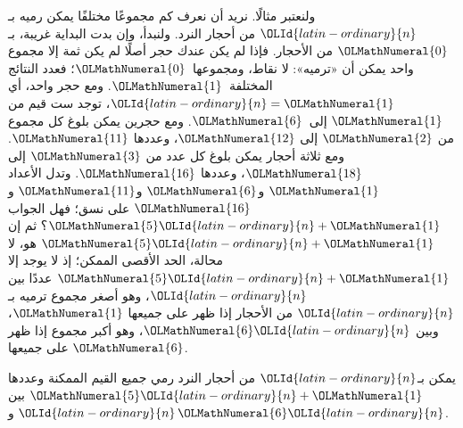 \documentclass[../../../include/open-logic-section]{subfiles}
\begin{document}
ولنعتبر مثالًا. نريد أن نعرف كم مجموعًا مختلفًا يمكن رميه بـ${\OLId{latin-ordinary}{n}}$ من
أحجار النرد. ولنبدأ، وإن بدت البداية غريبة، بـ${\OLMathNumeral{0}}$ من الأحجار. فإذا لم
يكن عندك حجر أصلًا لم يكن ثمة إلا مجموع واحد يمكن أن «ترميه»: لا نقاط،
ومجموعها~${\OLMathNumeral{0}}$؛ فعدد النتائج المختلفة~${\OLMathNumeral{1}}$. ومع حجر واحد، أي ${\OLId{latin-ordinary}{n}}={\OLMathNumeral{1}}$،
توجد ست قيم من ${\OLMathNumeral{1}}$ إلى~${\OLMathNumeral{6}}$. ومع حجرين يمكن بلوغ كل مجموع من ${\OLMathNumeral{2}}$ إلى
${\OLMathNumeral{12}}$، وعددها ${\OLMathNumeral{11}}$. ومع ثلاثة أحجار يمكن بلوغ كل عدد من ${\OLMathNumeral{3}}$ إلى
${\OLMathNumeral{18}}$، وعددها ${\OLMathNumeral{16}}$. وتدل الأعداد ${\OLMathNumeral{1}}$ و${\OLMathNumeral{6}}$ و${\OLMathNumeral{11}}$ و${\OLMathNumeral{16}}$ على نسق؛ فهل
الجواب ${\OLMathNumeral{5}}{\OLId{latin-ordinary}{n}}+{\OLMathNumeral{1}}$؟ ثم إن ${\OLMathNumeral{5}}{\OLId{latin-ordinary}{n}}+{\OLMathNumeral{1}}$ هو، لا محالة، الحد الأقصى الممكن؛ إذ لا
يوجد إلا ${\OLMathNumeral{5}}{\OLId{latin-ordinary}{n}}+{\OLMathNumeral{1}}$ عددًا بين ${\OLId{latin-ordinary}{n}}$، وهو أصغر مجموع ترميه بـ${\OLId{latin-ordinary}{n}}$ من الأحجار
إذا ظهر على جميعها ${\OLMathNumeral{1}}$، وبين ${\OLMathNumeral{6}}{\OLId{latin-ordinary}{n}}$، وهو أكبر مجموع إذا ظهر على جميعها
${\OLMathNumeral{6}}$.

\begin{thm}
  يمكن بـ${\OLId{latin-ordinary}{n}}$ من أحجار النرد رمي جميع القيم الممكنة وعددها ${\OLMathNumeral{5}}{\OLId{latin-ordinary}{n}}+{\OLMathNumeral{1}}$ بين
  ${\OLId{latin-ordinary}{n}}$ و${\OLMathNumeral{6}}{\OLId{latin-ordinary}{n}}$.
\end{thm}
\end{document}
